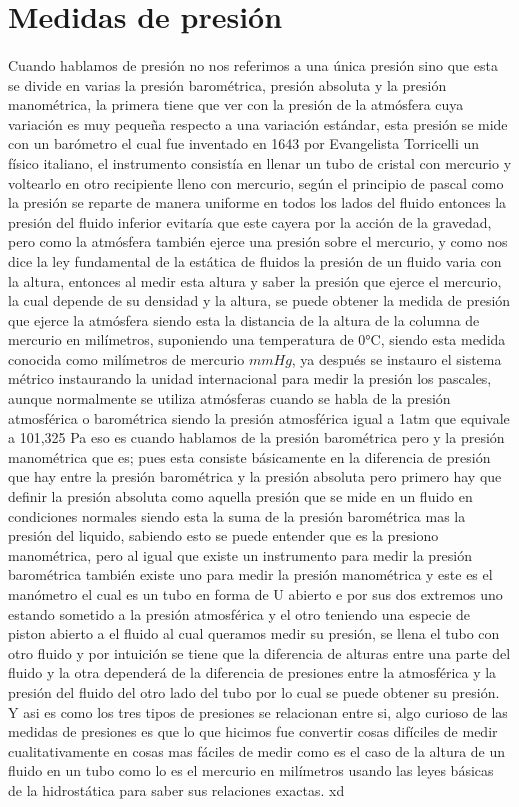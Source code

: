 \documentclass{article}
\begin{document}
\section*{Medidas de presión}
\paragraph*{}
Cuando hablamos de presión no nos referimos a una única presión sino que esta se divide en varias
la presión barométrica, presión absoluta y la presión manométrica, la primera tiene que ver con la presión
de la atmósfera cuya variación es muy pequeña respecto a una variación estándar, esta presión se mide con un 
barómetro el cual fue inventado en 1643 por Evangelista Torricelli un físico italiano, el instrumento consistía 
en llenar un tubo de cristal con mercurio y voltearlo en otro recipiente lleno con mercurio, según el principio de 
pascal como la presión se reparte de manera uniforme en todos los lados del fluido entonces la presión del fluido
inferior evitaría que este cayera por la acción de la gravedad, pero como la atmósfera también ejerce una presión
sobre el mercurio, y como nos dice la ley fundamental de la estática de fluidos la presión de un fluido
varia con la altura, entonces al medir esta altura y saber la presión que ejerce el mercurio, la cual depende
de su densidad y la altura, se puede obtener la medida de presión que ejerce la atmósfera siendo esta
la distancia de la altura de la columna de mercurio en milímetros, suponiendo una temperatura de 0°C,
siendo esta medida conocida como milímetros de mercurio $mmHg$, ya después se instauro el sistema métrico 
instaurando la unidad internacional 
para medir la presión los pascales, aunque normalmente se utiliza atmósferas cuando se habla de la
presión atmosférica o barométrica siendo la presión atmosférica igual a 1atm que equivale a 101,325 Pa
eso es cuando hablamos de la presión barométrica pero y la presión manométrica que es;
pues esta consiste básicamente en la diferencia de presión que hay entre la presión barométrica y la presión 
absoluta pero primero hay que definir la presión absoluta como aquella presión que se mide en un fluido en condiciones
normales siendo esta la suma de la presión barométrica mas la presión del liquido, sabiendo esto se puede entender que es la 
presiono manométrica, pero al igual que existe un instrumento para medir la presión barométrica también existe
uno para medir la presión manométrica y este es el manómetro el cual es un tubo en forma de U abierto e por sus dos extremos
uno estando sometido a la presión atmosférica y el otro teniendo una especie de piston abierto a el fluido
al cual queramos medir su presión, se llena el tubo con otro fluido y por intuición se tiene que la 
diferencia de alturas entre una parte del fluido y la otra dependerá de la diferencia de presiones entre la atmosférica y la presión del fluido
del otro lado del tubo por lo cual se puede obtener su presión.
Y asi es como los tres tipos de presiones se relacionan entre si, algo curioso de las medidas de presiones es que lo que hicimos
fue convertir cosas difíciles de medir cualitativamente en cosas mas fáciles de medir como es el caso de la altura de un fluido en un tubo 
como lo es el mercurio en milímetros usando las leyes básicas de la hidrostática para saber sus relaciones exactas.
xd
\end{document}
